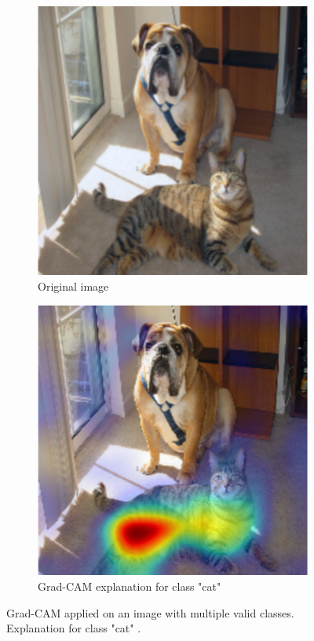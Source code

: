 \begin{figure}[H]
    \centering
    \begin{subfigure}{.5\textwidth}
        \centering
        \includegraphics[width=0.7\linewidth]{chapters/02_methods/images/grad-cam-original.png}
        \caption{Original image}
    \end{subfigure}\hfill%
    \begin{subfigure}{.5\textwidth}
        \centering
        \includegraphics[width=0.7\linewidth]{chapters/02_methods/images/grad-cam-cat.png}
        \caption{Grad-CAM explanation for class "cat"}
    \end{subfigure}
    \caption{Grad-CAM applied on an image with multiple valid classes. Explanation for class "cat" \cite{selvaraju2017grad}.}
    \label{grad_cam_cat}
\end{figure}

